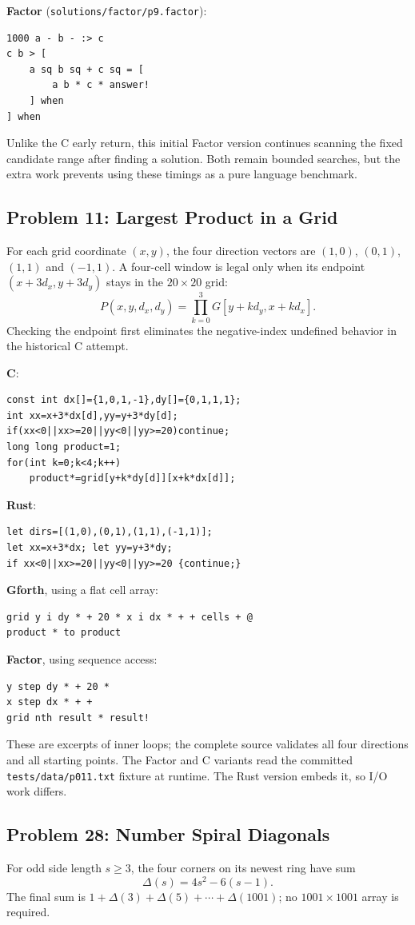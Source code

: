 \textbf{Factor} (\texttt{solutions/factor/p9.factor}):
\begin{lstlisting}
1000 a - b - :> c
c b > [
    a sq b sq + c sq = [
        a b * c * answer!
    ] when
] when
\end{lstlisting}
Unlike the C early return, this initial Factor version continues scanning the
fixed candidate range after finding a solution. Both remain bounded searches,
but the extra work prevents using these timings as a pure language benchmark.

\subsection{Problem 11: Largest Product in a Grid}
For each grid coordinate $(x,y)$, the four direction vectors are
$(1,0)$, $(0,1)$, $(1,1)$ and $(-1,1)$. A four-cell window is legal only
when its endpoint $(x+3d_x,y+3d_y)$ stays in the $20\times20$ grid:
\[
  P(x,y,d_x,d_y)=\prod_{k=0}^{3}G[y+kd_y,x+kd_x].
\]
Checking the endpoint first eliminates the negative-index undefined
behavior in the historical C attempt.

\textbf{C}:
\begin{lstlisting}
const int dx[]={1,0,1,-1},dy[]={0,1,1,1};
int xx=x+3*dx[d],yy=y+3*dy[d];
if(xx<0||xx>=20||yy<0||yy>=20)continue;
long long product=1;
for(int k=0;k<4;k++)
    product*=grid[y+k*dy[d]][x+k*dx[d]];
\end{lstlisting}

\textbf{Rust}:
\begin{lstlisting}
let dirs=[(1,0),(0,1),(1,1),(-1,1)];
let xx=x+3*dx; let yy=y+3*dy;
if xx<0||xx>=20||yy<0||yy>=20 {continue;}
\end{lstlisting}

\textbf{Gforth}, using a flat cell array:
\begin{lstlisting}
grid y i dy * + 20 * x i dx * + + cells + @
product * to product
\end{lstlisting}

\textbf{Factor}, using sequence access:
\begin{lstlisting}
y step dy * + 20 *
x step dx * + +
grid nth result * result!
\end{lstlisting}
These are excerpts of inner loops; the complete source validates all four
directions and all starting points. The Factor and C variants read the
committed \texttt{tests/data/p011.txt} fixture at runtime. The Rust version
embeds it, so I/O work differs.

\subsection{Problem 28: Number Spiral Diagonals}
For odd side length $s\geq3$, the four corners on its newest ring have sum
\[
  \Delta(s)=4s^2-6(s-1).
\]
The final sum is $1+\Delta(3)+\Delta(5)+\cdots+\Delta(1001)$; no
$1001\times1001$ array is required.

